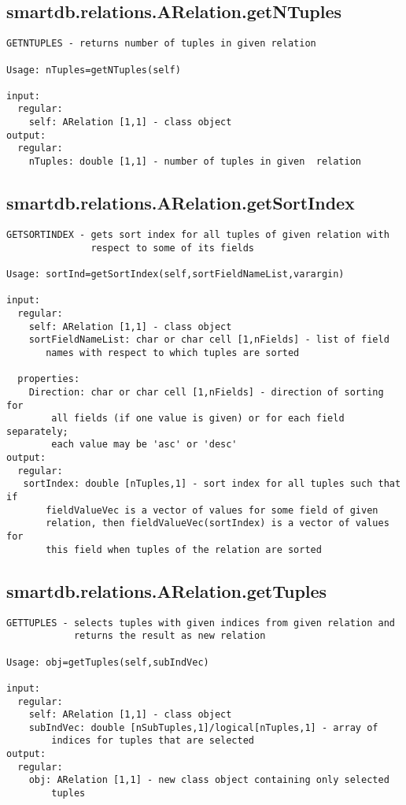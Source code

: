 \subsection{\texorpdfstring{smartdb.relations.ARelation.getNTuples}{getNTuples}}\label{method:smartdb.relations.ARelation.getNTuples}
\begin{verbatim}
GETNTUPLES - returns number of tuples in given relation

Usage: nTuples=getNTuples(self)

input:
  regular:
    self: ARelation [1,1] - class object
output:
  regular:
    nTuples: double [1,1] - number of tuples in given  relation
\end{verbatim}
\subsection{\texorpdfstring{smartdb.relations.ARelation.getSortIndex}{getSortIndex}}\label{method:smartdb.relations.ARelation.getSortIndex}
\begin{verbatim}
GETSORTINDEX - gets sort index for all tuples of given relation with
               respect to some of its fields

Usage: sortInd=getSortIndex(self,sortFieldNameList,varargin)

input:
  regular:
    self: ARelation [1,1] - class object
    sortFieldNameList: char or char cell [1,nFields] - list of field
       names with respect to which tuples are sorted

  properties:
    Direction: char or char cell [1,nFields] - direction of sorting for
        all fields (if one value is given) or for each field separately;
        each value may be 'asc' or 'desc'
output:
  regular:
   sortIndex: double [nTuples,1] - sort index for all tuples such that if
       fieldValueVec is a vector of values for some field of given
       relation, then fieldValueVec(sortIndex) is a vector of values for
       this field when tuples of the relation are sorted
\end{verbatim}
\subsection{\texorpdfstring{smartdb.relations.ARelation.getTuples}{getTuples}}\label{method:smartdb.relations.ARelation.getTuples}
\begin{verbatim}
GETTUPLES - selects tuples with given indices from given relation and
            returns the result as new relation

Usage: obj=getTuples(self,subIndVec)

input:
  regular:
    self: ARelation [1,1] - class object
    subIndVec: double [nSubTuples,1]/logical[nTuples,1] - array of
        indices for tuples that are selected
output:
  regular:
    obj: ARelation [1,1] - new class object containing only selected
        tuples
\end{verbatim}
